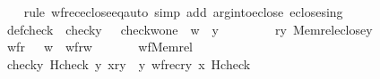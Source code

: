 \begin{isabellebody}
%
\isadelimproof
\ \ %
\endisadelimproof
%
\isatagproof
{}\isamarkupfalse%
\ {\isacharparenleft}{\kern0pt}rule\ wfrec{\isacharunderscore}{\kern0pt}eclose{\isacharunderscore}{\kern0pt}eq{\isacharcomma}{\kern0pt}auto\ simp\ add{\isacharcolon}{\kern0pt}\ arg{\isacharunderscore}{\kern0pt}into{\isacharunderscore}{\kern0pt}eclose\ eclose{\isacharunderscore}{\kern0pt}sing{\isacharparenright}{\kern0pt}%
\endisatagproof
{\isafoldproof}%
%
\isadelimproof
\isanewline
%
\endisadelimproof
\isanewline
{}\isamarkupfalse%
\ def{\isacharunderscore}{\kern0pt}check\ {\isacharcolon}{\kern0pt}\ {\isachardoublequoteopen}check{\isacharparenleft}{\kern0pt}y{\isacharparenright}{\kern0pt}\ {\isacharequal}{\kern0pt}\ {\isacharbraceleft}{\kern0pt}\ {\isasymlangle}check{\isacharparenleft}{\kern0pt}w{\isacharparenright}{\kern0pt}{\isacharcomma}{\kern0pt}one{\isasymrangle}\ {\isachardot}{\kern0pt}\ w\ {\isasymin}\ y{\isacharbraceright}{\kern0pt}{\isachardoublequoteclose}\isanewline
%
\isadelimproof
%
\endisadelimproof
%
\isatagproof
{}\isamarkupfalse%
\ {\isacharminus}{\kern0pt}\isanewline
\ \ \isamarkupfalse%
\isanewline
\ \ \ \ {\isacharquery}{\kern0pt}r{\isacharequal}{\kern0pt}{\isachardoublequoteopen}{\isasymlambda}y{\isachardot}{\kern0pt}\ Memrel{\isacharparenleft}{\kern0pt}eclose{\isacharparenleft}{\kern0pt}{\isacharbraceleft}{\kern0pt}y{\isacharbraceright}{\kern0pt}{\isacharparenright}{\kern0pt}{\isacharparenright}{\kern0pt}{\isachardoublequoteclose}\isanewline
\ \ \isamarkupfalse%
\ wfr{\isacharcolon}{\kern0pt}\ \ \ {\isachardoublequoteopen}{\isasymforall}w\ {\isachardot}{\kern0pt}\ wf{\isacharparenleft}{\kern0pt}{\isacharquery}{\kern0pt}r{\isacharparenleft}{\kern0pt}w{\isacharparenright}{\kern0pt}{\isacharparenright}{\kern0pt}{\isachardoublequoteclose}\ \isanewline
\ \ \ \ \isamarkupfalse%
\ wf{\isacharunderscore}{\kern0pt}Memrel\ \isacommand{{\isachardot}{\kern0pt}{\isachardot}{\kern0pt}}\isamarkupfalse%
\isanewline
\ \ \isamarkupfalse%
\ \isanewline
\ \ \isamarkupfalse%
\ {\isachardoublequoteopen}check{\isacharparenleft}{\kern0pt}y{\isacharparenright}{\kern0pt}{\isacharequal}{\kern0pt}\ Hcheck{\isacharparenleft}{\kern0pt}\ y{\isacharcomma}{\kern0pt}\ {\isasymlambda}x{\isasymin}{\isacharquery}{\kern0pt}r{\isacharparenleft}{\kern0pt}y{\isacharparenright}{\kern0pt}\ {\isacharminus}{\kern0pt}{\isacharbackquote}{\kern0pt}{\isacharbackquote}{\kern0pt}\ {\isacharbraceleft}{\kern0pt}y{\isacharbraceright}{\kern0pt}{\isachardot}{\kern0pt}\ wfrec{\isacharparenleft}{\kern0pt}{\isacharquery}{\kern0pt}r{\isacharparenleft}{\kern0pt}y{\isacharparenright}{\kern0pt}{\isacharcomma}{\kern0pt}\ x{\isacharcomma}{\kern0pt}\ Hcheck{\isacharparenright}{\kern0pt}{\isacharparenright}{\kern0pt}{\isachardoublequoteclose}\isanewline

\end{isabellebody}
